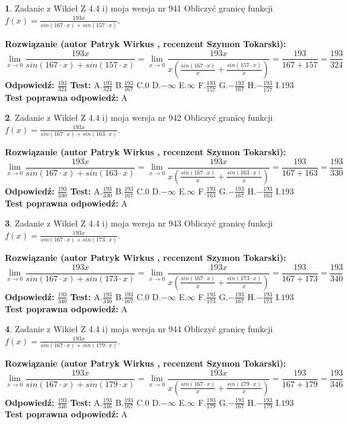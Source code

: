 \documentclass[12pt, a4paper]{article}
\theoremstyle{definition} %
\newtheorem{zad}{}
\newcommand{\zadStart}[1]{\begin{zad}#1\newline}
\newcommand{\zadStop}{\end{zad}}
\newcommand{\rozwStart}[2]{\noindent \textbf{Rozwiązanie (autor #1 , recenzent #2): }\newline}
\newcommand{\rozwStop}{\newline}
\newcommand{\odpStart}{\noindent \textbf{Odpowiedź:}\newline}
\newcommand{\odpStop}{\newline}
\newcommand{\testStart}{\noindent \textbf{Test:}\newline}
\newcommand{\testStop}{\newline}
\newcommand{\kluczStart}{\noindent \textbf{Test poprawna odpowiedź:}\newline}
\newcommand{\kluczStop}{\newline}
\begin{document}
\zadStart{Zadanie z Wikieł Z 4.4 i) moja wersja nr 941}
Obliczyć granicę funkcji $f(x)=\frac{193x}{sin(167\cdot x) +sin(157\cdot x)}$.
\zadStop
\rozwStart{Patryk Wirkus}{Szymon Tokarski}
$$\lim\limits_{x\to 0}\frac{193x}{sin(167\cdot x) +sin(157\cdot x)}=\lim\limits_{x\to 0}\frac{193x}{x(\frac{sin(167\cdot x)}{x}+\frac{sin(157\cdot x)}{x})}=\frac{193}{167+157} = \frac{193}{324}$$
\rozwStop
\odpStart
$\frac{193}{324}$
\odpStop
\testStart
A.$\frac{193}{324}$
B.$\frac{193}{167}$
C.$0$
D.$-\infty$
E.$\infty$
F.$\frac{193}{157}$
G.$-\frac{193}{167}$
H.$-\frac{193}{157}$
I.$193$
\testStop
\kluczStart
A
\kluczStop



\zadStart{Zadanie z Wikieł Z 4.4 i) moja wersja nr 942}
Obliczyć granicę funkcji $f(x)=\frac{193x}{sin(167\cdot x) +sin(163\cdot x)}$.
\zadStop
\rozwStart{Patryk Wirkus}{Szymon Tokarski}
$$\lim\limits_{x\to 0}\frac{193x}{sin(167\cdot x) +sin(163\cdot x)}=\lim\limits_{x\to 0}\frac{193x}{x(\frac{sin(167\cdot x)}{x}+\frac{sin(163\cdot x)}{x})}=\frac{193}{167+163} = \frac{193}{330}$$
\rozwStop
\odpStart
$\frac{193}{330}$
\odpStop
\testStart
A.$\frac{193}{330}$
B.$\frac{193}{167}$
C.$0$
D.$-\infty$
E.$\infty$
F.$\frac{193}{163}$
G.$-\frac{193}{167}$
H.$-\frac{193}{163}$
I.$193$
\testStop
\kluczStart
A
\kluczStop



\zadStart{Zadanie z Wikieł Z 4.4 i) moja wersja nr 943}
Obliczyć granicę funkcji $f(x)=\frac{193x}{sin(167\cdot x) +sin(173\cdot x)}$.
\zadStop
\rozwStart{Patryk Wirkus}{Szymon Tokarski}
$$\lim\limits_{x\to 0}\frac{193x}{sin(167\cdot x) +sin(173\cdot x)}=\lim\limits_{x\to 0}\frac{193x}{x(\frac{sin(167\cdot x)}{x}+\frac{sin(173\cdot x)}{x})}=\frac{193}{167+173} = \frac{193}{340}$$
\rozwStop
\odpStart
$\frac{193}{340}$
\odpStop
\testStart
A.$\frac{193}{340}$
B.$\frac{193}{167}$
C.$0$
D.$-\infty$
E.$\infty$
F.$\frac{193}{173}$
G.$-\frac{193}{167}$
H.$-\frac{193}{173}$
I.$193$
\testStop
\kluczStart
A
\kluczStop



\zadStart{Zadanie z Wikieł Z 4.4 i) moja wersja nr 944}
Obliczyć granicę funkcji $f(x)=\frac{193x}{sin(167\cdot x) +sin(179\cdot x)}$.
\zadStop
\rozwStart{Patryk Wirkus}{Szymon Tokarski}
$$\lim\limits_{x\to 0}\frac{193x}{sin(167\cdot x) +sin(179\cdot x)}=\lim\limits_{x\to 0}\frac{193x}{x(\frac{sin(167\cdot x)}{x}+\frac{sin(179\cdot x)}{x})}=\frac{193}{167+179} = \frac{193}{346}$$
\rozwStop
\odpStart
$\frac{193}{346}$
\odpStop
\testStart
A.$\frac{193}{346}$
B.$\frac{193}{167}$
C.$0$
D.$-\infty$
E.$\infty$
F.$\frac{193}{179}$
G.$-\frac{193}{167}$
H.$-\frac{193}{179}$
I.$193$
\testStop
\kluczStart
A
\kluczStop
\end{document}
